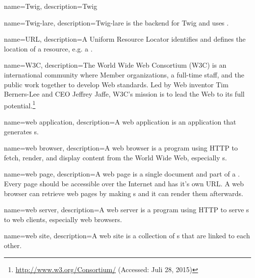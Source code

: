 {
  name=Twig,
  description={Twig}
}

{
  name=Twig-lare,
  description={Twig-lare is the \lare{} backend for Twig and uses \phpLare{}.}
}

{
  name=URL,
  description={A Uniform Resource Locator identifies and defines the location of a resource, e.g. a \webPage{}.}
}

{
  name=W3C,
  description={The World Wide Web Consortium (W3C) is an international community where Member organizations, a full-time staff, and the public work together to develop Web standards. Led by Web inventor Tim Berners-Lee and CEO Jeffrey Jaffe, W3C's mission is to lead the Web to its full potential.\footnote{\url{http://www.w3.org/Consortium/} (Accessed: Juli 28, 2015)}}
}

{
  name=web application,
  description={A web application is an application that generates \webPage{}s.}
}

{
  name=web browser,
  description={A web browser is a program using HTTP to fetch, render, and display content from the World Wide Web, especially \webPage{}s.}
}

{
  name=web page,
  description={A web page is a single document and part of a \webSite{}. 
  Every page should be accessible over the Internet and has it's own URL.
  A web browser can retrieve web pages by making \httpRequest{}s and it can render them afterwards.}
}

{
  name=web server,
  description={A web server is a program using HTTP to serve \webPage{}s to web clients, especially web browsers.}
}

{
  name=web site,
  description={A web site is a collection of \webPage{}s that are linked to each other.}
}

